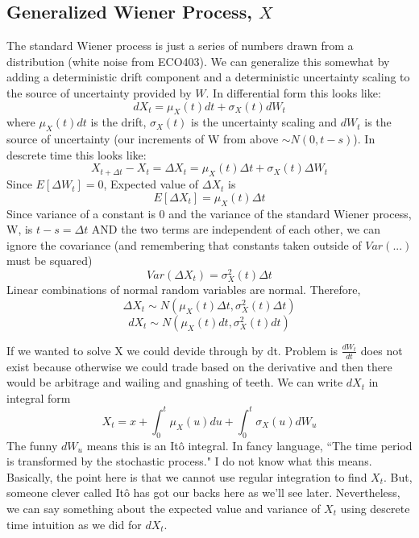 \documentclass[12pt]{article}
\begin{document}
\subsection{Generalized Wiener Process, $X$}
The standard Wiener process is just a series of numbers drawn from a
distribution (white noise from ECO403). We can generalize this somewhat by
adding a deterministic drift component and a deterministic uncertainty scaling
to the source of uncertainty provided by $W$. In differential form this looks
like:
\begin{equation} \label{dGenW}
dX_t=\mu_X(t)dt+\sigma_X(t)dW_t
\end{equation}
where $\mu_X(t)dt$ is the drift, $\sigma_X(t)$ is the uncertainty scaling and
$dW_t$ is the source of uncertainty (our increments of W from above
$\sim N(0, t-s)$).
In descrete time this looks like:
\begin{equation}
X_{t+\Delta t}-X_t=\Delta X_t=\mu_X(t)\Delta t+\sigma_X(t)\Delta W_t
\end{equation}
Since $E[\Delta W_t]=0$, Expected value of $\Delta X_t$ is
\begin{equation} \label{ExpDesGenW}
E[\Delta X_t]=\mu_X(t)\Delta t
\end{equation}
Since variance of a constant is 0 and the variance of the standard Wiener
process, W, is $t-s=\Delta t$ AND the two terms are independent of each other,
we can ignore the covariance (and remembering that constants taken outside of
$Var(...)$ must be squared)
\begin{equation} \label{VarDesGenW}
Var(\Delta X_t)=\sigma^2_X(t)\Delta t
\end{equation}
Linear combinations of normal random variables are normal. Therefore,
\begin{equation}
\Delta X_t \sim N(\mu_X(t)\Delta t, \sigma^2_X(t)\Delta t)
\end{equation}
\begin{equation}
dX_t \sim N(\mu_X(t)dt, \sigma^2_X(t)dt)
\end{equation}

If we wanted to solve X we could devide through by dt. Problem is
$\frac{dW_t}{dt}$ does not exist because otherwise we could trade based on the
derivative and then there would be arbitrage and wailing and gnashing of teeth.
We can write $dX_t$ in integral form
\begin{equation} \label{GenW}
X_t=x+\int_0^t\mu_X(u)du+\int_0^t\sigma_X(u)dW_u
\end{equation}
The funny $dW_u$ means this is an It\^o integral. In fancy language, ``The time
period is transformed by the stochastic process." I do not know what this
means. Basically, the point here is that we cannot use regular integration to
find $X_t$. But, someone clever called It\^o has got our backs here as we'll
see later. Nevertheless, we can say something about the expected value and
variance of $X_t$ using descrete time intuition as we did for $dX_t$.
\end{document}

